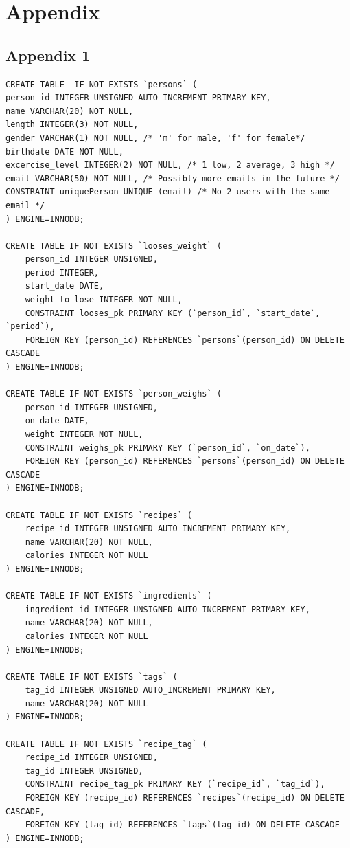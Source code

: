 \section*{Appendix}
\subsection*{Appendix 1}
\begin{lstlisting}[caption=Script of database]
CREATE TABLE  IF NOT EXISTS `persons` (
person_id INTEGER UNSIGNED AUTO_INCREMENT PRIMARY KEY,
name VARCHAR(20) NOT NULL,
length INTEGER(3) NOT NULL,
gender VARCHAR(1) NOT NULL, /* 'm' for male, 'f' for female*/
birthdate DATE NOT NULL,
excercise_level INTEGER(2) NOT NULL, /* 1 low, 2 average, 3 high */
email VARCHAR(50) NOT NULL, /* Possibly more emails in the future */
CONSTRAINT uniquePerson UNIQUE (email) /* No 2 users with the same email */
) ENGINE=INNODB;

CREATE TABLE IF NOT EXISTS `looses_weight` (
    person_id INTEGER UNSIGNED,
    period INTEGER,
    start_date DATE,
    weight_to_lose INTEGER NOT NULL,
    CONSTRAINT looses_pk PRIMARY KEY (`person_id`, `start_date`, `period`),
    FOREIGN KEY (person_id) REFERENCES `persons`(person_id) ON DELETE CASCADE
) ENGINE=INNODB;

CREATE TABLE IF NOT EXISTS `person_weighs` (
    person_id INTEGER UNSIGNED,
    on_date DATE,
    weight INTEGER NOT NULL,
    CONSTRAINT weighs_pk PRIMARY KEY (`person_id`, `on_date`),
    FOREIGN KEY (person_id) REFERENCES `persons`(person_id) ON DELETE CASCADE
) ENGINE=INNODB;

CREATE TABLE IF NOT EXISTS `recipes` (
    recipe_id INTEGER UNSIGNED AUTO_INCREMENT PRIMARY KEY,
    name VARCHAR(20) NOT NULL,
    calories INTEGER NOT NULL
) ENGINE=INNODB;

CREATE TABLE IF NOT EXISTS `ingredients` (
    ingredient_id INTEGER UNSIGNED AUTO_INCREMENT PRIMARY KEY,
    name VARCHAR(20) NOT NULL,
    calories INTEGER NOT NULL
) ENGINE=INNODB;

CREATE TABLE IF NOT EXISTS `tags` (
    tag_id INTEGER UNSIGNED AUTO_INCREMENT PRIMARY KEY,
    name VARCHAR(20) NOT NULL
) ENGINE=INNODB;

CREATE TABLE IF NOT EXISTS `recipe_tag` (
    recipe_id INTEGER UNSIGNED,
    tag_id INTEGER UNSIGNED,
    CONSTRAINT recipe_tag_pk PRIMARY KEY (`recipe_id`, `tag_id`),
    FOREIGN KEY (recipe_id) REFERENCES `recipes`(recipe_id) ON DELETE CASCADE,
    FOREIGN KEY (tag_id) REFERENCES `tags`(tag_id) ON DELETE CASCADE
) ENGINE=INNODB;


\end{lstlisting}
